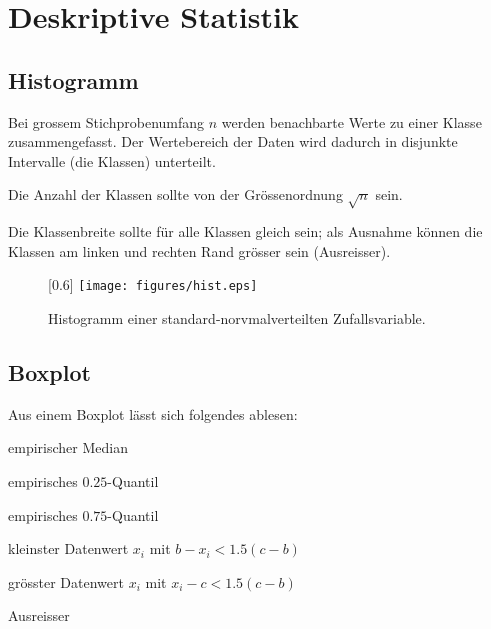 


\section{Deskriptive Statistik}




\subsection{Histogramm}

Bei grossem Stichprobenumfang \(n\) werden benachbarte Werte zu einer Klasse zusammengefasst. Der Wertebereich der Daten wird dadurch in disjunkte Intervalle (die Klassen) unterteilt.
\begin{compactenum}[i)]
	\item Die Anzahl der Klassen sollte von der Grössenordnung \(\sqrt{n}\) sein.
	\item Die Klassenbreite sollte für alle Klassen gleich sein; als Ausnahme können die Klassen am linken und rechten Rand grösser sein (Ausreisser).
\end{compactenum}

\begin{figure}[htb]
	\begin{center}
		\scalebox{0.6}[0.6]{
			\texttt{[image: figures/hist.eps]}}
	\end{center}
	\vspace{-2em}
	\caption{Histogramm einer standard-norvmalverteilten Zufallsvariable.}
\end{figure}




\subsection{Boxplot}

Aus einem Boxplot lässt sich folgendes ablesen:
\begin{compactenum}[a:]
	\item empirischer Median
	\item empirisches \(0.25\)-Quantil
	\item empirisches \(0.75\)-Quantil
	\item kleinster Datenwert \(x_i\) mit \(b-x_i < 1.5 (c-b)\)
	\item grösster Datenwert \(x_i\) mit \(x_i - c < 1.5 (c-b)\)
	\item Ausreisser
\end{compactenum}


